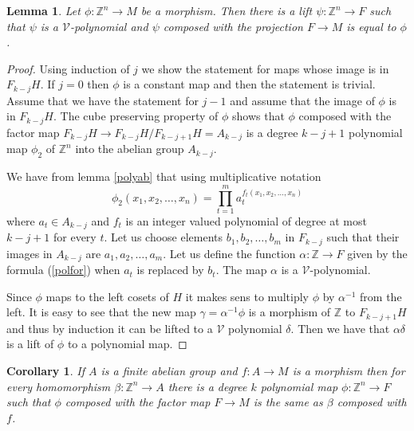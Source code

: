 \documentclass [11pt] {article}
\newtheorem{lemma}{Lemma}[section]
\newtheorem{corollary}{Corollary}[section]
\begin{document}
\begin{lemma}\label{felemelo} Let $\phi:\mathbb{Z}^n\rightarrow M$ be a morphism. Then there is a lift $\psi:\mathbb{Z}^n\rightarrow F$ such that $\psi$ is a $\mathcal{V}$-polynomial and $\psi$ composed with the projection $F\rightarrow M$ is equal to $\phi$.
\end{lemma}

\begin{proof} Using induction of $j$ we show the statement for maps whose image is in $F_{k-j}H$.
If $j=0$ then $\phi$ is a constant map and then the statement is trivial. Assume that we have the statement for $j-1$ and assume that the image of $\phi$ is in $F_{k-j}H$.
The cube preserving property of $\phi$ shows that $\phi$ composed with the factor map $F_{k-j}H\rightarrow F_{k-j}H/F_{k-j+1}H=A_{k-j}$ is a degree $k-j+1$ polynomial map $\phi_2$ of $\mathbb{Z}^n$ into the abelian group $A_{k-j}$. 

We have from lemma \ref{polyab} that using multiplicative notation
\begin{equation}\label{polfor}
\phi_2(x_1,x_2,\dots,x_n)=\prod_{t=1}^m a_t^{f_t(x_1,x_2,\dots,x_n)}
\end{equation}
where $a_t\in A_{k-j}$ and $f_t$ is an integer valued polynomial of degree at most $k-j+1$ for every $t$. Let us choose elements $b_1,b_2,\dots,b_m$ in $F_{k-j}$ such that their images in $A_{k-j}$ are $a_1,a_2,\dots,a_m$.
Let us define the function $\alpha:\mathbb{Z}\rightarrow F$ given by the formula (\ref{polfor}) when $a_t$ is replaced by $b_t$. The map $\alpha$ is a $\mathcal{V}$-polynomial.

Since $\phi$ maps to the left cosets of 
$H$ it makes sens to multiply $\phi$ by $\alpha^{-1}$ from the left. It is easy to see that the new map $\gamma=\alpha^{-1}\phi$ is a morphism of $\mathbb{Z}$ to $F_{k-j+1}H$ and thus by induction it can be lifted to a $\mathcal{V}$ polynomial $\delta$. Then we have that $\alpha\delta$ is a lift of $\phi$ to a polynomial map. 
\end{proof}

\begin{corollary} If $A$ is a finite abelian group and $f:A\rightarrow M$ is a morphism then for every homomorphism $\beta:\mathbb{Z}^n\rightarrow A$ there is a degree $k$ polynomial map $\phi:\mathbb{Z}^n\rightarrow F$ such that $\phi$ composed with the factor map $F\rightarrow M$ is the same as $\beta$ composed with $f$.
\end{corollary}
\end{document}
